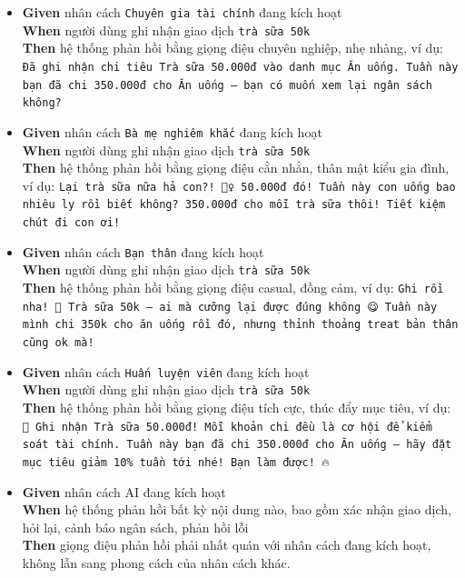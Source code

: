 \begin{itemize}
\item \textbf{Given} nhân cách \texttt{Chuyên gia tài chính} đang kích hoạt  \\ \hspace*{1.5em}  \textbf{When} người dùng ghi nhận giao dịch \texttt{trà sữa 50k}  \\ \hspace*{1.5em}  \textbf{Then} hệ thống phản hồi bằng giọng điệu chuyên nghiệp, nhẹ nhàng, ví dụ: \texttt{Đã ghi nhận chi tiêu Trà sữa 50.000đ vào danh mục Ăn uống. Tuần này bạn đã chi 350.000đ cho Ăn uống — bạn có muốn xem lại ngân sách không?}
\item \textbf{Given} nhân cách \texttt{Bà mẹ nghiêm khắc} đang kích hoạt  \\ \hspace*{1.5em}  \textbf{When} người dùng ghi nhận giao dịch \texttt{trà sữa 50k}  \\ \hspace*{1.5em}  \textbf{Then} hệ thống phản hồi bằng giọng điệu cằn nhằn, thân mật kiểu gia đình, ví dụ: \texttt{Lại trà sữa nữa hả con?! 🤦‍♀️ 50.000đ đó! Tuần này con uống bao nhiêu ly rồi biết không? 350.000đ cho mỗi trà sữa thôi! Tiết kiệm chút đi con ơi!}
\item \textbf{Given} nhân cách \texttt{Bạn thân} đang kích hoạt  \\ \hspace*{1.5em}  \textbf{When} người dùng ghi nhận giao dịch \texttt{trà sữa 50k}  \\ \hspace*{1.5em}  \textbf{Then} hệ thống phản hồi bằng giọng điệu casual, đồng cảm, ví dụ: \texttt{Ghi rồi nha! 🧋 Trà sữa 50k — ai mà cưỡng lại được đúng không 😋 Tuần này mình chi 350k cho ăn uống rồi đó, nhưng thỉnh thoảng treat bản thân cũng ok mà!}
\item \textbf{Given} nhân cách \texttt{Huấn luyện viên} đang kích hoạt  \\ \hspace*{1.5em}  \textbf{When} người dùng ghi nhận giao dịch \texttt{trà sữa 50k}  \\ \hspace*{1.5em}  \textbf{Then} hệ thống phản hồi bằng giọng điệu tích cực, thúc đẩy mục tiêu, ví dụ: \texttt{💪 Ghi nhận Trà sữa 50.000đ! Mỗi khoản chi đều là cơ hội để kiểm soát tài chính. Tuần này bạn đã chi 350.000đ cho Ăn uống — hãy đặt mục tiêu giảm 10\% tuần tới nhé! Bạn làm được! 🔥}
\item \textbf{Given} nhân cách AI đang kích hoạt  \\ \hspace*{1.5em}  \textbf{When} hệ thống phản hồi bất kỳ nội dung nào, bao gồm xác nhận giao dịch, hỏi lại, cảnh báo ngân sách, phản hồi lỗi  \\ \hspace*{1.5em}  \textbf{Then} giọng điệu phản hồi phải nhất quán với nhân cách đang kích hoạt, không lẫn sang phong cách của nhân cách khác.

\end{itemize}
